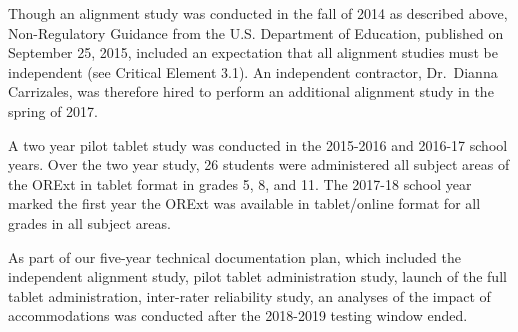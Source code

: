 \documentclass[]{article}
\begin{document}
Though an alignment study was conducted in the fall of 2014 as described
above, Non-Regulatory Guidance from the U.S. Department of Education,
published on September 25, 2015, included an expectation that all
alignment studies must be independent (see Critical Element 3.1). An
independent contractor, Dr.~Dianna Carrizales, was therefore hired to
perform an additional alignment study in the spring of 2017.

A two year pilot tablet study was conducted in the 2015-2016 and 2016-17
school years. Over the two year study, 26 students were administered all
subject areas of the ORExt in tablet format in grades 5, 8, and 11. The
2017-18 school year marked the first year the ORExt was available in
tablet/online format for all grades in all subject areas.

As part of our five-year technical documentation plan, which included
the independent alignment study, pilot tablet administration study,
launch of the full tablet administration, inter-rater reliability study,
an analyses of the impact of accommodations was conducted after the
2018-2019 testing window ended.
\end{document}
